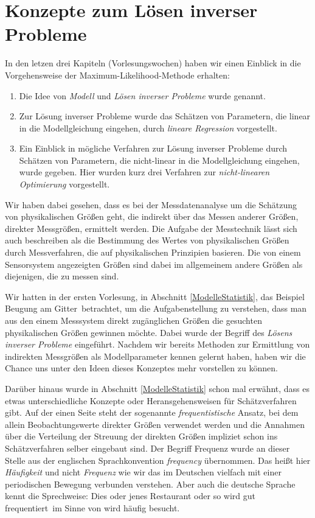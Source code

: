 \label{KonzepteinverseProbleme}

\section{Konzepte zum Lösen inverser Probleme}

In den letzen drei Kapiteln (Vorlesungswochen) haben wir einen Einblick in die
Vorgehensweise der Maximum-Likelihood-Methode erhalten:
\begin{enumerate}
\item Die Idee von \textsl{Modell} und \textsl{Lösen inverser Probleme} wurde
  genannt.
\item Zur Lösung inverser Probleme wurde das Schätzen von Parametern, die
 linear in die Modellgleichung eingehen, durch \textsl{lineare Regression} vorgestellt.
\item Ein Einblick in mögliche Verfahren zur Lösung inverser Probleme durch
  Schätzen von Parametern, die nicht-linear in die Modellgleichung eingehen,
  wurde gegeben. Hier wurden kurz drei Verfahren zur \textsl{nicht-linearen Optimierung}
  vorgestellt.
\end{enumerate}
Wir haben dabei gesehen, dass es bei der Messdatenanalyse um die Schätzung von
physikalischen Größen geht, die indirekt über das Messen anderer Größen,
direkter Messgrößen, ermittelt werden.
Die Aufgabe der Messtechnik lässt sich auch beschreiben als die Bestimmung
des Wertes von physikalischen Größen durch Messverfahren, die auf
physikalischen Prinzipien basieren. Die von einem Sensorsystem angezeigten
Größen sind dabei im allgemeinem andere Größen als diejenigen, die zu messen sind.

Wir hatten in der ersten Vorlesung, in Abschnitt \ref{ModelleStatistik},
das Beispiel \glqq Beugung am Gitter\grqq ~betrachtet,
um die Aufgabenstellung zu verstehen, dass man
aus den einem Messsystem direkt zugänglichen Größen die gesuchten physikalischen
Größen gewinnen möchte. Dabei wurde der Begriff des \textsl{Lösens inverser Probleme}
eingeführt. Nachdem wir bereits Methoden zur Ermittlung von indirekten
Messgrößen als Modellparameter kennen gelernt haben, haben wir die Chance uns
unter den Ideen dieses Konzeptes mehr vorstellen zu können.

Darüber hinaus wurde in Abschnitt \ref{ModelleStatistik} schon mal erwähnt, dass
es etwas unterschiedliche Konzepte oder Heransgehensweisen für Schätzverfahren gibt.
Auf der einen Seite steht der sogenannte \textsl{frequentistische} Ansatz, bei dem allein
Beobachtungswerte direkter Größen verwendet werden und die Annahmen über die
Verteilung der Streuung der direkten Größen impliziet schon ins Schätzverfahren
selber eingebaut sind. Der Begriff Frequenz wurde an dieser Stelle aus der
englischen Sprachkonvention \textsl{frequency} übernommen. Das
heißt hier \textsl{Häufigkeit} und nicht \textsl{Frequenz} wie wir das im Deutschen
vielfach mit einer periodischen Bewegung verbunden verstehen. Aber auch die
deutsche Sprache kennt die Sprechweise: \glqq Dies oder jenes Restaurant oder so
wird gut frequentiert\grqq ~im Sinne von \glqq wird häufig besucht\grqq.

